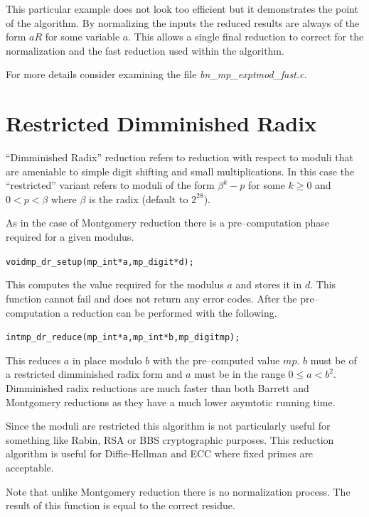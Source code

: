 \documentclass[synpaper]{book}
\begin{document}
This particular example does not look too efficient but it demonstrates the point of the algorithm.  By 
normalizing the inputs the reduced results are always of the form $aR$ for some variable $a$.  This allows
a single final reduction to correct for the normalization and the fast reduction used within the algorithm.

For more details consider examining the file \textit{bn\_mp\_exptmod\_fast.c}.

\section{Restricted Dimminished Radix}

``Dimminished Radix'' reduction refers to reduction with respect to moduli that are ameniable to simple
digit shifting and small multiplications.  In this case the ``restricted'' variant refers to moduli of the
form $\beta^k - p$ for some $k \ge 0$ and $0 < p < \beta$ where $\beta$ is the radix (default to $2^{28}$).  

As in the case of Montgomery reduction there is a pre--computation phase required for a given modulus.

\begin{alltt}
void mp_dr_setup(mp_int *a, mp_digit *d);
\end{alltt}

This computes the value required for the modulus $a$ and stores it in $d$.  This function cannot fail
and does not return any error codes.  After the pre--computation a reduction can be performed with the
following.

\begin{alltt}
int mp_dr_reduce(mp_int *a, mp_int *b, mp_digit mp);
\end{alltt}

This reduces $a$ in place modulo $b$ with the pre--computed value $mp$.  $b$ must be of a restricted
dimminished radix form and $a$ must be in the range $0 \le a < b^2$.  Dimminished radix reductions are 
much faster than both Barrett and Montgomery reductions as they have a much lower asymtotic running time.  

Since the moduli are restricted this algorithm is not particularly useful for something like Rabin, RSA or
BBS cryptographic purposes.  This reduction algorithm is useful for Diffie-Hellman and ECC where fixed
primes are acceptable.  

Note that unlike Montgomery reduction there is no normalization process.  The result of this function is
equal to the correct residue.
\end{document}
